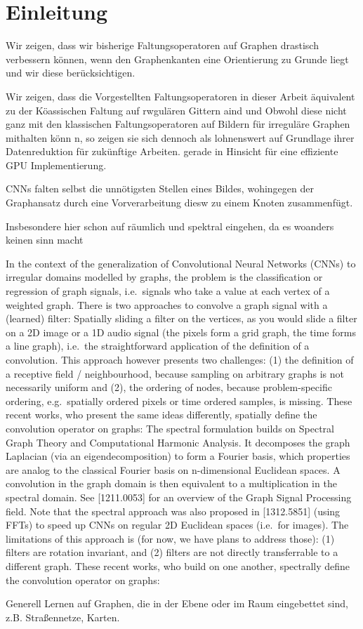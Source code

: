 \chapter{Einleitung}
\label{einleitung}

Wir zeigen, dass wir bisherige Faltungsoperatoren auf Graphen drastisch verbessern können, wenn den Graphenkanten eine Orientierung zu Grunde liegt und wir diese berücksichtigen.

Wir zeigen, dass die Vorgestellten Faltungsoperatoren in dieser Arbeit äquivalent zu der Köassischen Faltung auf rwgulären Gittern aind und
Obwohl diese nicht ganz mit den klassischen Faltungsoperatoren auf Bildern für irreguläre Graphen mithalten könn n, so zeigen sie sich dennoch als lohnenswert auf Grundlage ihrer Datenreduktion für zukünftige Arbeiten.
gerade in Hinsicht für eine effiziente GPU Implementierung.

CNNs falten selbst die unnötigsten Stellen eines Bildes, wohingegen der Graphansatz durch eine Vorverarbeitung diesw zu einem Knoten zusammenfügt.

Insbesondere hier schon auf räumlich und spektral eingehen, da es woanders keinen sinn macht

In the context of the generalization of Convolutional Neural Networks (CNNs) to irregular domains modelled by graphs, the problem is the classification or regression of graph signals, i.e.\ signals who take a value at each vertex of a weighted graph. There is two approaches to convolve a graph signal with a (learned) filter:
Spatially sliding a filter on the vertices, as you would slide a filter on a 2D image or a 1D audio signal (the pixels form a grid graph, the time forms a line graph), i.e.\ the straightforward application of the definition of a convolution. This approach however presents two challenges: (1) the definition of a receptive field / neighbourhood, because sampling on arbitrary graphs is not necessarily uniform and (2), the ordering of nodes, because problem-specific ordering, e.g.\ spatially ordered pixels or time ordered samples, is missing. These recent works, who present the same ideas differently, spatially define the convolution operator on graphs:
The spectral formulation builds on Spectral Graph Theory and Computational Harmonic Analysis. It decomposes the graph Laplacian (via an eigendecomposition) to form a Fourier basis, which properties are analog to the classical Fourier basis on n-dimensional Euclidean spaces. A convolution in the graph domain is then equivalent to a multiplication in the spectral domain. See [1211.0053] for an overview of the Graph Signal Processing field. Note that the spectral approach was also proposed in [1312.5851] (using FFTs) to speed up CNNs on regular 2D Euclidean spaces (i.e.\ for images). The limitations of this approach is (for now, we have plans to address those): (1) filters are rotation invariant, and (2) filters are not directly transferrable to a different graph. These recent works, who build on one another, spectrally define the convolution operator on graphs:

Generell Lernen auf Graphen, die in der Ebene oder im Raum eingebettet sind, z.B. Straßennetze, Karten.



